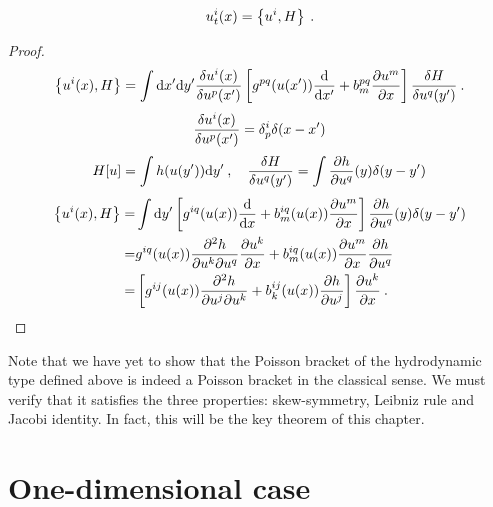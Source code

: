 \begin{proposition}
    \begin{align}
        u^i_t(x) = \left \lbrace u^i,H \right \rbrace \:.
    \end{align}
\end{proposition}
\begin{proof}
    \begin{align}
        \left \lbrace u^i(x),H \right \rbrace = \int \mathrm{d} x' \mathrm{d} y' \frac{\delta u^i(x)}{\delta u^p(x')} \left[ g^{pq}(u(x')) \frac{\mathrm{d}}{\mathrm{d}x'} + b^{pq}_m \frac{\partial u^m}{\partial x} \right] \frac{\delta H}{\delta u^q(y')} \:.
    \end{align}
    \begin{align}
        \frac{\delta u^i(x)}{\delta u^p(x')} = \delta^i_p \delta(x-x')
    \end{align}
    \begin{align}
        H[u] = \int h(u(y')) \mathrm{d} y' \:, \quad \frac{\delta H}{\delta u^q(y')} = \int \frac{\partial h}{\partial u^q}(y) \delta(y-y')
    \end{align}
    \begin{align}
        \left \lbrace u^i(x),H \right \rbrace =& \int \mathrm{d} y' \left[ g^{iq}(u(x)) \frac{\mathrm{d}}{\mathrm{d}x} + b^{iq}_m(u(x)) \frac{\partial u^m}{\partial x} \right] \frac{\partial h}{\partial u^q}(y) \delta(y-y') 
        \\ =& g^{iq}(u(x)) \frac{\partial ^2 h}{\partial u^k \partial u^q} \frac{\partial u^k}{\partial x} + b^{iq}_m(u(x)) \frac{\partial u^m}{\partial x} \frac{\partial h}{\partial u^q}
        \\ =& \left[ g^{ij}(u(x)) \frac{\partial ^2 h}{\partial u^j \partial u^k}  + b^{ij}_k(u(x))  \frac{\partial h}{\partial u^j} \right] \frac{\partial u^k}{\partial x} \:.
    \end{align}
\end{proof}

Note that we have yet to show that the Poisson bracket of the hydrodynamic type defined above is indeed a Poisson bracket in the classical sense. We must verify that it satisfies the three properties: skew-symmetry, Leibniz rule and Jacobi identity. In fact, this will be the key theorem of this chapter.

\section{One-dimensional case}

